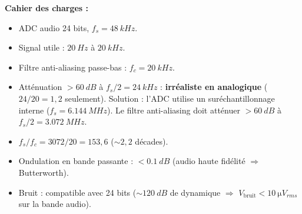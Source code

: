 \documentclass[12pt,a4paper,twoside]{book}
\begin{document}
\begin{pratique}
\textbf{Cahier des charges :}
\begin{itemize}[nosep]
\item ADC audio 24 bits, $f_s = \SI{48}{kHz}$.
\item Signal utile : $\SI{20}{Hz}$ à $\SI{20}{kHz}$.
\item Filtre anti-aliasing passe-bas : $f_c = \SI{20}{kHz}$.
\item Atténuation $> \SI{60}{dB}$ à $f_s/2 = \SI{24}{kHz}$ : \textbf{irréaliste en analogique} ($24/20 = 1{,}2$ seulement). Solution : l'ADC utilise un suréchantillonnage interne ($f_s = \SI{6.144}{MHz}$). Le filtre anti-aliasing doit atténuer $> \SI{60}{dB}$ à $f_s/2 = \SI{3.072}{MHz}$.
\item $f_s/f_c = 3072/20 = 153{,}6$ ($\sim 2{,}2$ décades).
\item Ondulation en bande passante : $< \SI{0.1}{dB}$ (audio haute fidélité $\Rightarrow$ Butterworth).
\item Bruit : compatible avec 24 bits ($\sim \SI{120}{dB}$ de dynamique $\Rightarrow$ $V_{\text{bruit}} < \SI{10}{\micro V_{rms}}$ sur la bande audio).
\end{itemize}
\end{pratique}
\end{document}
